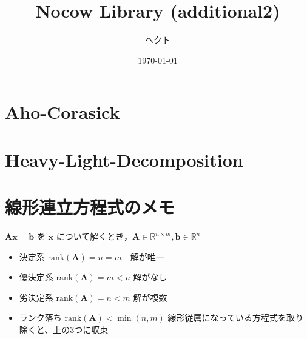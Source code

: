 \documentclass[9pt,twocolumn,a4paper,landscape]{extarticle}
\title{Nocow Library (additional2)}
\author{ヘクト}
\date{\today}
\begin{document}
\maketitle

\begin{comment}
\begin{center}
\begin{minipage}{4cm}
	\begin{verbatim}
	　　ＡＡ
	　⊂・・⊃▼⌒ヽ
	　(ω＿) )　 ●|〜*
	　　　ＵＵ〜ーＵ
	\end{verbatim}
\end{minipage}
\end{center}
\end{comment}



\section{Aho-Corasick}

\section{Heavy-Light-Decomposition}

\section{線形連立方程式のメモ}

$\mathbf{Ax} = \mathbf{b}$ を $\mathbf{x}$ について解くとき，$\mathbf{A} \in \mathbb{R}^{n \times m},\mathbf{b} \in \mathbb{R}^n$


\begin{itemize}
	\item 決定系 $\text{rank}(\mathbf{A}) = n = m$　解が唯一
	\item 優決定系 $\text{rank}(\mathbf{A}) = m < n$ 解がなし
	\item 劣決定系 $\text{rank}(\mathbf{A}) = n < m$ 解が複数
	\item ランク落ち $\text{rank}(\mathbf{A}) < \min(n,m)$ 線形従属になっている方程式を取り除くと、上の3つに収束
\end{itemize}
\end{document}
